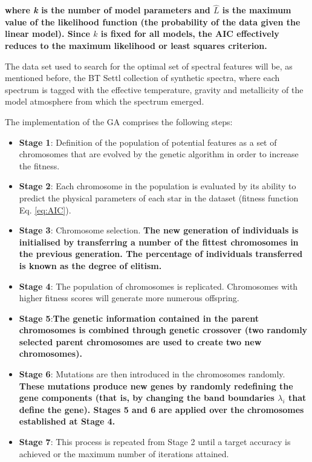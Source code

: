 \zeroindent{}
\textbf{
where \textit{k} is the number of model parameters and $\hat{L}$ is
the maximum value of the likelihood function (the probability of the
data given the linear model). Since $k$ is fixed for all models, the
AIC effectively reduces to the maximum likelihood or least squares
criterion.}

The data set used to search for the optimal set of spectral features
will be, as mentioned before, the BT Settl collection of synthetic
spectra, where each spectrum is tagged with the effective temperature,
gravity and metallicity of the model atmosphere from which the
spectrum emerged.

The implementation of the GA comprises the following steps:

\begin{itemize}
\item \textbf{Stage 1}:{ Definition of the population of
potential features as a set of chromosomes that are evolved by the
genetic algorithm in order to increase the fitness.}

\item \textbf{Stage 2}:{ Each chromosome in the population
is evaluated by its ability to predict the physical parameters of each
star in the dataset (fitness function Eq. \ref{eq:AIC}). }

\item \textbf{Stage 3}:{ Chromosome selection. {\bf The new
generation of individuals is initialised by transferring a number of
the fittest chromosomes in the previous generation. The percentage of
individuals transferred is known as the degree of elitism.}}

\item \textbf{Stage 4}:{ The population of chromosomes is replicated. 
 Chromosomes with higher fitness scores will generate more numerous
 offspring.}

\item \textbf{Stage 5}:{ {\bf The genetic information contained in
the parent chromosomes is combined through genetic crossover (two
randomly selected parent chromosomes are used to create two new
chromosomes).}}

\item \textbf{Stage 6}:{ Mutations are then introduced in the
chromosomes randomly. {\bf These mutations produce new genes by
randomly redefining the gene components (that is, by changing the band
boundaries $\lambda_i$ that define the gene).  Stages 5 and 6 are
applied over the chromosomes established at Stage 4.}}

\item \textbf{Stage 7}:{ This process is repeated from Stage 2 until 
a target accuracy is achieved or the maximum number of iterations
attained.}

\end{itemize}

